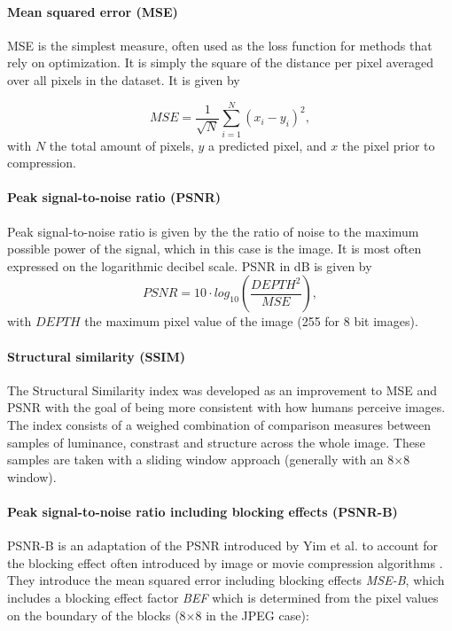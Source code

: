 \paragraph{Mean squared error (MSE)}
MSE is the simplest measure, often used as the loss function for methods that rely on optimization. It is simply the square of the distance per pixel averaged over all pixels in the dataset. It is given by

$$
\textit{MSE}= \frac{1}{\sqrt{N}} \sum^N_{i=1}({x}_i - y_i)^2,
$$
with $N$ the total amount of pixels, $y$ a predicted pixel, and ${x}$ the pixel prior to compression.

\paragraph{Peak signal-to-noise ratio (PSNR)}
Peak signal-to-noise ratio is given by the the ratio of noise to the maximum possible power of the signal, which in this case is the image. It is most often expressed on the logarithmic decibel scale. PSNR in dB is given by
$$
\textit{PSNR} = 10 \cdot \textit{log}_{10}(\frac{\textit{DEPTH}^2}{\textit{MSE}}),
$$
with $\textit{DEPTH}$ the maximum pixel value of the image (255 for 8 bit images). 

\paragraph{Structural similarity (SSIM)}
The Structural Similarity index was developed as an improvement to MSE and PSNR with the goal of being more consistent with how humans perceive images\cite{wang2004imagessim}. The index consists of a weighed combination of comparison measures between samples of luminance, constrast and structure across the whole image. These samples are taken with a sliding window approach (generally with an 8$\times$8 window).

\paragraph{Peak signal-to-noise ratio including blocking effects (PSNR-B)}
PSNR-B is an adaptation of the PSNR introduced by Yim et al. to account for the blocking effect often introduced by image or movie compression algorithms \cite{yim2011qualitypsnrb}. They introduce the mean squared error including blocking effects \textit{MSE-B}, which includes a blocking effect factor \textit{BEF} which is determined from the pixel values on the boundary of the blocks (8$\times$8 in the JPEG case):

